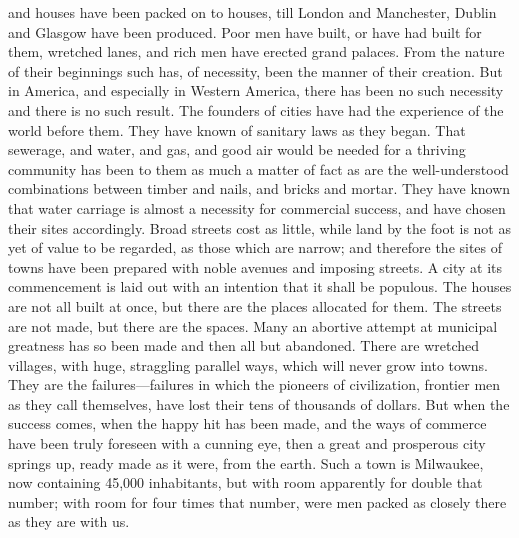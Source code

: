 and houses have been packed on to houses, till London and
Manchester, Dublin and Glasgow have been produced.  Poor men have
built, or have had built for them, wretched lanes, and rich men
have erected grand palaces.  From the nature of their beginnings
such has, of necessity, been the manner of their creation.  But in
America, and especially in Western America, there has been no such
necessity and there is no such result.  The founders of cities have
had the experience of the world before them.  They have known of
sanitary laws as they began.  That sewerage, and water, and gas,
and good air would be needed for a thriving community has been to
them as much a matter of fact as are the well-understood
combinations between timber and nails, and bricks and mortar.  They
have known that water carriage is almost a necessity for commercial
success, and have chosen their sites accordingly.  Broad streets
cost as little, while land by the foot is not as yet of value to be
regarded, as those which are narrow; and therefore the sites of
towns have been prepared with noble avenues and imposing streets.
A city at its commencement is laid out with an intention that it
shall be populous.  The houses are not all built at once, but there
are the places allocated for them.  The streets are not made, but
there are the spaces.  Many an abortive attempt at municipal
greatness has so been made and then all but abandoned.  There are
wretched villages, with huge, straggling parallel ways, which will
never grow into towns.  They are the failures---failures in which
the pioneers of civilization, frontier men as they call themselves,
have lost their tens of thousands of dollars.  But when the success
comes, when the happy hit has been made, and the ways of commerce
have been truly foreseen with a cunning eye, then a great and
prosperous city springs up, ready made as it were, from the earth.
Such a town is Milwaukee, now containing 45,000 inhabitants, but
with room apparently for double that number; with room for four
times that number, were men packed as closely there as they are
with us.

